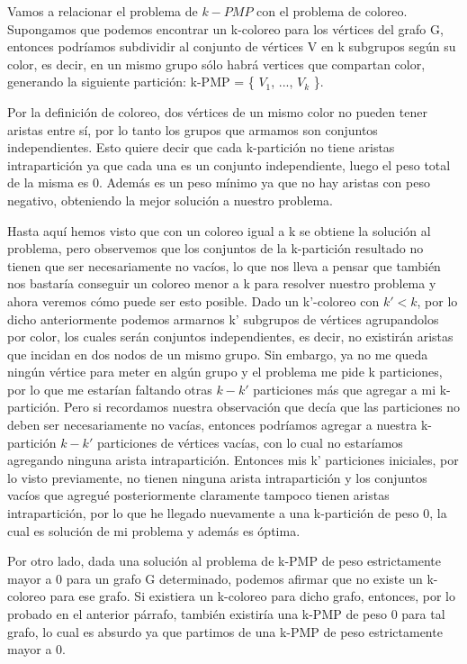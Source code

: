 Vamos a relacionar el problema de $k-PMP$ con el problema de coloreo. Supongamos que podemos encontrar un k-coloreo para los vértices del grafo G, entonces podríamos subdividir al conjunto de vértices V en k subgrupos según su color, es decir, en un mismo grupo sólo habrá vertices que compartan color, generando la siguiente partición: k-PMP = \{ $V_1$, ..., $V_k$ \}. 

Por la definición de coloreo, dos vértices de un mismo color no pueden tener aristas entre sí, por lo tanto los grupos que armamos son conjuntos independientes. Esto quiere decir que cada k-partición no tiene aristas intrapartición ya que cada una es un conjunto independiente, luego el peso total de la misma es $0$. Además es un peso mínimo ya que no hay aristas con peso negativo, obteniendo la mejor solución a nuestro problema.

Hasta aquí hemos visto que con un coloreo igual a k se obtiene la solución al problema, pero observemos que los conjuntos de la k-partición resultado no tienen que ser necesariamente no vacíos, lo que nos lleva a pensar que también nos bastaría conseguir un coloreo menor a k para resolver nuestro problema y ahora veremos cómo puede ser esto posible. Dado un k'-coloreo con $k'<k$, por lo dicho anteriormente podemos armarnos k' subgrupos de vértices agrupandolos por color, los cuales serán conjuntos independientes, es decir, no existirán aristas que incidan en dos nodos de un mismo grupo. Sin embargo, ya no me queda ningún vértice para meter en algún grupo y el problema me pide k particiones, por lo que me estarían faltando otras $k-k'$ particiones más que agregar a mi k-partición. Pero si recordamos nuestra observación que decía que las particiones no deben ser necesariamente no vacías, entonces podríamos agregar a nuestra k-partición $k-k'$ particiones de vértices vacías, con lo cual no estaríamos agregando ninguna arista intrapartición. Entonces mis k' particiones iniciales, por lo visto previamente, no tienen ninguna arista intrapartición y los conjuntos vacíos que agregué posteriormente claramente tampoco tienen aristas intrapartición, por lo que he llegado nuevamente a una k-partición de peso $0$, la cual es solución de mi problema y además es óptima.

Por otro lado, dada una solución al problema de k-PMP de peso estrictamente mayor a $0$ para un grafo G determinado, podemos afirmar que no existe un k-coloreo para ese grafo. Si existiera un k-coloreo para dicho grafo, entonces, por lo probado en el anterior párrafo, también existiría una k-PMP de peso $0$ para tal grafo, lo cual es absurdo ya que partimos de una k-PMP de peso estrictamente mayor a $0$.
